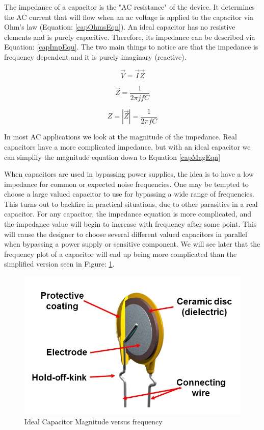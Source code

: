 The impedance of a capacitor is the "AC resistance" of the device. It determines the AC current that will flow when an ac voltage is applied to the capacitor via Ohm's law (Equation: \eqref{capOhmsEqn}). An ideal capacitor has no resistive elements and is purely capacitive. Therefore, its impedance can be described via Equation: \eqref{capImpEqu}. The two main things to notice are that the impedance is frequency dependent and it is purely imaginary (reactive).

\begin{equation}
\label{capOhmsEqn}
\vec{V} = \vec{I} \vec{Z}
\end{equation}

\begin{equation}
\label{capImpEqu}
\vec{Z} = \frac{1}{2\pi jfC}
\end{equation}

\begin{equation}
\label{capMagEqn}
Z = |\vec{Z}| = \frac{1}{2\pi fC}
\end{equation}

In most AC applications we look at the magnitude of the impedance. Real capacitors have a more complicated impedance, but with an ideal capacitor we can simplify the magnitude equation down to Equation \eqref{capMagEqn}

When capacitors are used in bypassing power supplies, the idea is to have a low impedance for common or expected noise frequencies. One may be tempted to choose a large valued capacitor to use for bypassing a wide range of frequencies. This turns out to backfire in practical situations, due to other parasitics in a real capacitor. For any capacitor, the impedance equation is more complicated, and the impedance value will begin to increase with frequency after some point. This will cause the designer to choose several different valued capacitors in parallel when bypassing a power supply or sensitive component. We will see later that the frequency plot of a capacitor will end up being more complicated than the simplified version seen in Figure: \ref{idealCapMagfig}.

\begin{figure}
\includegraphics[keepaspectratio=true,scale=.5]{./figures/testImage.png}
\centering
\caption{Ideal Capacitor Magnitude versus frequency}
\label{idealCapMagfig}
\end{figure}

